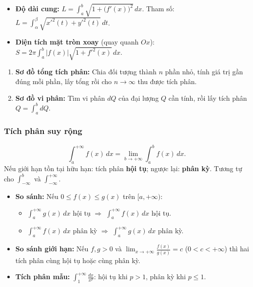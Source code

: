 \documentclass[12pt,a4paper]{article}
\begin{document}
\begin{congthuc}[title={Độ dài cung và diện tích mặt tròn xoay}]
  \begin{itemize}
    \item \textbf{Độ dài cung:} $L = \displaystyle\int_a^b \sqrt{1 + \bigl(f'(x)\bigr)^2}\,dx$. Tham số: $L = \displaystyle\int_\alpha^\beta \sqrt{x'^2(t) + y'^2(t)}\,dt$.
    \item \textbf{Diện tích mặt tròn xoay} (quay quanh $Ox$): $S = 2\pi\displaystyle\int_a^b |f(x)|\sqrt{1 + f'^2(x)}\,dx$.
  \end{itemize}
\end{congthuc}

\begin{phuongphap}[title={Hai sơ đồ ứng dụng tích phân}]
  \begin{enumerate}
    \item \textbf{Sơ đồ tổng tích phân:} Chia đối tượng thành $n$ phần nhỏ, tính giá trị gần đúng mỗi phần, lấy tổng rồi cho $n \to \infty$ thu được tích phân.
    \item \textbf{Sơ đồ vi phân:} Tìm vi phân $dQ$ của đại lượng $Q$ cần tính, rồi lấy tích phân $Q = \displaystyle\int_a^b dQ$.
  \end{enumerate}
\end{phuongphap}

\subsubsection{Tích phân suy rộng}

\begin{dinhnghia}[title={Tích phân suy rộng loại 1 (cận vô hạn)}]
  \[
    \int_a^{+\infty} f(x)\,dx = \lim_{b \to +\infty} \int_a^b f(x)\,dx.
  \]
  Nếu giới hạn tồn tại hữu hạn: tích phân \textbf{hội tụ}; ngược lại: \textbf{phân kỳ}. Tương tự cho $\displaystyle\int_{-\infty}^b$ và $\displaystyle\int_{-\infty}^{+\infty}$.
\end{dinhnghia}

\begin{dinhly}[title={Tiêu chuẩn hội tụ loại 1}]
  \begin{itemize}
    \item \textbf{So sánh:} Nếu $0 \le f(x) \le g(x)$ trên $[a, +\infty)$:
      \begin{itemize}
        \item $\int_a^{+\infty} g(x)\,dx$ hội tụ $\Rightarrow$ $\int_a^{+\infty} f(x)\,dx$ hội tụ.
        \item $\int_a^{+\infty} f(x)\,dx$ phân kỳ $\Rightarrow$ $\int_a^{+\infty} g(x)\,dx$ phân kỳ.
      \end{itemize}
    \item \textbf{So sánh giới hạn:} Nếu $f, g > 0$ và $\displaystyle\lim_{x \to +\infty} \frac{f(x)}{g(x)} = c$ ($0 < c < +\infty$) thì hai tích phân cùng hội tụ hoặc cùng phân kỳ.
    \item \textbf{Tích phân mẫu:} $\displaystyle\int_1^{+\infty} \frac{dx}{x^p}$: hội tụ khi $p > 1$, phân kỳ khi $p \le 1$.
  \end{itemize}
\end{dinhly}
\end{document}
